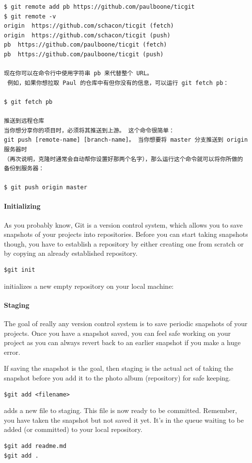 \begin{verbatim}
$ git remote add pb https://github.com/paulboone/ticgit
$ git remote -v
origin	https://github.com/schacon/ticgit (fetch)
origin	https://github.com/schacon/ticgit (push)
pb	https://github.com/paulboone/ticgit (fetch)
pb	https://github.com/paulboone/ticgit (push)

现在你可以在命令行中使用字符串 pb 来代替整个 URL。
 例如，如果你想拉取 Paul 的仓库中有但你没有的信息，可以运行 git fetch pb：

$ git fetch pb

推送到远程仓库
当你想分享你的项目时，必须将其推送到上游。 这个命令很简单：
git push [remote-name] [branch-name]。 当你想要将 master 分支推送到 origin 服务器时
（再次说明，克隆时通常会自动帮你设置好那两个名字），那么运行这个命令就可以将你所做的备份到服务器：

$ git push origin master

\end{verbatim}


\paragraph*{Initializing}

As you probably know, Git is a version control system, which allows you to save snapshots of your projects into repositories. Before you can start taking snapshots though, you have to establish a repository by either creating one from scratch or by copying an already established repository.

\begin{verbatim}
$git init 
\end{verbatim}

initializes a new empty repository on your local machine:

\paragraph*{Staging}

The goal of really any version control system is to save periodic snapshots of your projects. Once you have a snapshot saved, you can feel safe working on your project as you can always revert back to an earlier snapshot if you make a huge error.

If saving the snapshot is the goal, then staging is the actual act of taking the snapshot before you add it to the photo album (repository) for safe keeping.

\begin{verbatim}
$git add <filename> 
\end{verbatim}
adds a new file to staging. This file is now ready to be committed. Remember, you have taken the snapshot but not saved it yet. It’s in the queue waiting to be added (or committed) to your local repository.
\begin{verbatim}
$git add readme.md
$git add . 
\end{verbatim}

